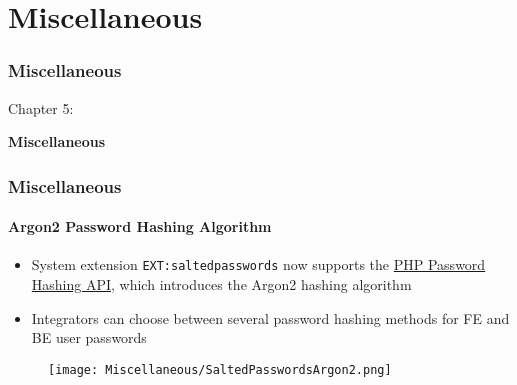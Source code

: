 %

\section{Miscellaneous}
\begin{frame}[fragile]
	\frametitle{Miscellaneous}

	\begin{center}\huge{Chapter 5:}\end{center}
	\begin{center}\huge{\color{typo3darkgrey}\textbf{Miscellaneous}}\end{center}

\end{frame}


\begin{frame}[fragile]
	\frametitle{Miscellaneous}
	\framesubtitle{Argon2 Password Hashing Algorithm}

	\begin{itemize}
		\item System extension \texttt{EXT:saltedpasswords} now supports the
			\href{https://secure.php.net/manual/en/ref.password.php}{PHP Password Hashing API},
			which introduces the Argon2 hashing algorithm
		\item Integrators can choose between several password hashing methods
			for FE and BE user passwords
	\end{itemize}

	\begin{figure}
		\texttt{[image: Miscellaneous/SaltedPasswordsArgon2.png]}
	\end{figure}


\end{frame}

